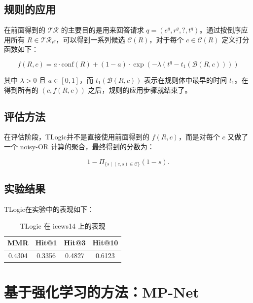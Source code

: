\documentclass[a4paper, AutoFakeBold]{article}
\begin{document}
\subsection{规则的应用}

在前面得到的 $\mathcal{TR}$ 的主要目的是用来回答请求 $q = (e^q, r^q, ?, t^q)$。通过按倒序应用所有 $R\in\mathcal{TR}_{r^q}$，可以得到一系列候选 $\mathcal{C}(R)$，对于每个 $c \in \mathcal{C}(R)$ 定义打分函数如下：


\begin{equation}
	f(R,c) = a \cdot \mathrm{conf}(R) + (1-a) \cdot \exp(-\lambda (t^q - t_1(\mathcal{B}(R,c))))
\end{equation}


其中 $\lambda>0$ 且 $a\in[0,1]$，而 $t_1(\mathcal{B}(R,c))$ 表示在规则体中最早的时间 $t_1$。在得到所有的 $(c, f(R,c))$ 之后，规则的应用步骤就结束了。

\subsection{评估方法}

在评估阶段，TLogic并不是直接使用前面得到的 $f(R,c)$，而是对每个 $c$ 又做了一个 noisy-OR 计算的聚合，最终得到的分数为：


\begin{equation}
	1 - \Pi_{\{s \mid (c, s) \in \mathcal{C}\}} (1 - s).
\end{equation}


\subsection{实验结果}

TLogic在实验中的表现如下：


\begin{table}[htbp]
	\centering
	\caption{TLogic 在 icews14 上的表现}
	\begin{tabular}{cccc}
		\toprule  %
		MMR&Hit@1&Hit@3&Hit@10 \\ 
		\midrule  %
		0.4304&0.3356&0.4827&0.6123 \\
		\bottomrule  %
	\end{tabular}
\end{table}


\section{基于强化学习的方法：MP-Net}
\end{document}
